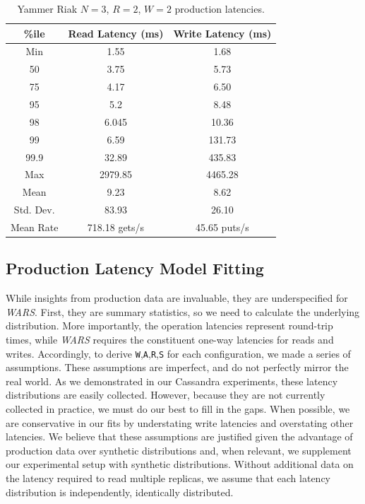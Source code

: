 \documentclass{vldb}
\begin{document}
\begin{table}
\centering
\begin{tabular}{|c|c|c|}
\hline
\%ile & Read Latency (ms) & Write Latency (ms)\\
\hline
Min & 1.55 & 1.68\\
50 & 3.75 & 5.73 \\
75 & 4.17 & 6.50\\
95 & 5.2 & 8.48\\
98 & 6.045 & 10.36 \\
99 & 6.59 & 131.73\\
99.9 & 32.89 & 435.83\\
Max & 2979.85 &  4465.28 \\
\hline
Mean & 9.23 & 8.62 \\
Std. Dev. & 83.93 & 26.10\\
\hline
Mean Rate & 718.18 gets/s & 45.65 puts/s\\
\hline
\end{tabular}
\caption{Yammer Riak $N$$=$$3$, $R$$=$$2$, $W$$=$$2$ production latencies.}
\label{table:yammer}
\end{table}

\subsection{Production Latency Model Fitting}

While insights from production data are invaluable, they are underspecified 
for \textit{WARS}.  First, they are summary statistics, so we need to
calculate the underlying distribution.  More importantly, the
operation latencies represent round-trip times, while \textit{WARS}
requires the constituent one-way latencies for reads and writes.
Accordingly, to derive \texttt{W},\texttt{A},\texttt{R},\texttt{S} for
each configuration, we made a series of assumptions.  These
assumptions are imperfect, and do not perfectly mirror the real world.
As we demonstrated in our Cassandra experiments, these latency
distributions are easily collected.  However, because they are not
currently collected in practice, we must do our best to fill in the
gaps.  When possible, we are conservative in our fits by understating
write latencies and overstating other latencies.  We believe that
these assumptions are justified given the advantage of production data
over synthetic distributions and, when relevant, we supplement our
experimental setup with synthetic distributions.  Without additional
data on the latency required to read multiple replicas, we assume that
each latency distribution is independently, identically distributed.
\end{document}
